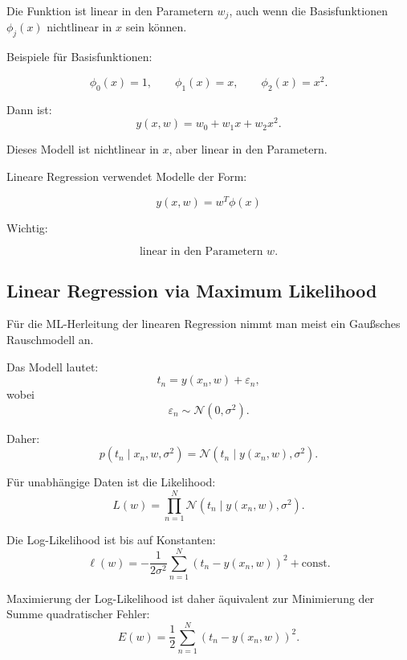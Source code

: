\documentclass[11pt,a4paper]{scrartcl}
\begin{document}
\begin{solutionbox}
    Die Funktion ist linear in den Parametern \(w_j\), auch wenn die
    Basisfunktionen \(\phi_j(x)\) nichtlinear in \(x\) sein können.

    Beispiele für Basisfunktionen:

    \[
        \phi_0(x)=1,
        \qquad
        \phi_1(x)=x,
        \qquad
        \phi_2(x)=x^2.
    \]

    Dann ist:
    \[
        y(x,w)
        =
        w_0 + w_1x + w_2x^2.
    \]

    Dieses Modell ist nichtlinear in \(x\), aber linear in den Parametern.
\end{solutionbox}

\begin{answerbox}
    Lineare Regression verwendet Modelle der Form:

    \[
        \boxed{
            y(x,w)
            =
            w^T\phi(x)
        }
    \]

    Wichtig:

    \[
        \boxed{
            \text{linear in den Parametern } w.
        }
    \]
\end{answerbox}

\subsection{Linear Regression via Maximum Likelihood}

\begin{notebox}
    Für die ML-Herleitung der linearen Regression nimmt man meist ein
    Gaußsches Rauschmodell an.

    Das Modell lautet:
    \[
        t_n
        =
        y(x_n,w) + \varepsilon_n,
    \]
    wobei
    \[
        \varepsilon_n
        \sim \mathcal{N}(0,\sigma^2).
    \]

    Daher:
    \[
        p(t_n \mid x_n,w,\sigma^2)
        =
        \mathcal{N}(t_n \mid y(x_n,w),\sigma^2).
    \]
\end{notebox}

\begin{calculationbox}
    Für unabhängige Daten ist die Likelihood:
    \[
        L(w)
        =
        \prod_{n=1}^{N}
        \mathcal{N}(t_n \mid y(x_n,w),\sigma^2).
    \]

    Die Log-Likelihood ist bis auf Konstanten:
    \[
        \ell(w)
        =
        -\frac{1}{2\sigma^2}
        \sum_{n=1}^{N}
        \left(t_n-y(x_n,w)\right)^2
        + \text{const}.
    \]

    Maximierung der Log-Likelihood ist daher äquivalent zur Minimierung der
    Summe quadratischer Fehler:
    \[
        E(w)
        =
        \frac{1}{2}
        \sum_{n=1}^{N}
        \left(t_n-y(x_n,w)\right)^2.
    \]
\end{calculationbox}
\end{document}
